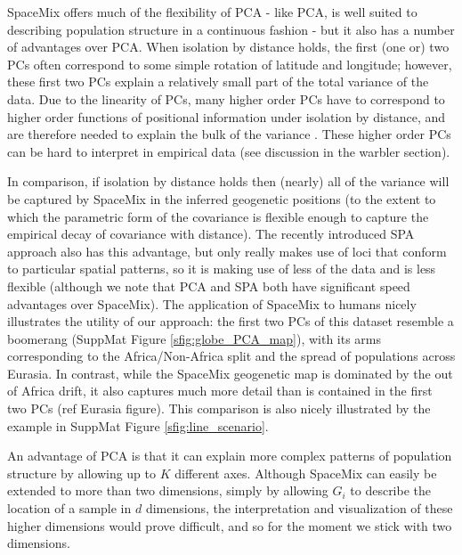 \documentclass[12pt]{article}
\begin{document}
SpaceMix offers much of the flexibility of PCA - like PCA, is well suited to describing population structure in a continuous fashion - 
but it also has a number of advantages over PCA. 
When isolation by distance holds, the first (one or) two PCs often correspond to some simple rotation of latitude and longitude; 
however, these first two PCs explain a relatively small part of the total variance of the data. 
Due to the linearity of PCs, many higher order PCs 
have to correspond to higher order functions of positional information under isolation by distance, 
and are therefore needed to explain the bulk of the variance \citep{novembre_interpreting_2008}. 
These higher order PCs can be hard to interpret in empirical data (see discussion in the warbler section).

In comparison, if isolation by distance holds then (nearly) all of the variance will be captured by SpaceMix in the inferred geogenetic positions 
(to the extent to which the parametric form of the covariance is flexible enough to capture the empirical decay of covariance with distance). 
The recently introduced SPA approach \citep{yang_model-based_2012} also has this advantage, 
but only really makes use of loci that conform to particular spatial patterns,
so it is making use of less of the data and is less flexible 
(although we note that PCA and SPA both have significant speed advantages over SpaceMix).  
The application of SpaceMix to humans nicely illustrates the utility of our approach: 
the first two PCs of this dataset resemble a boomerang (SuppMat Figure \ref{sfig:globe_PCA_map}), 
with its arms corresponding to the Africa/Non-Africa split and the spread of populations across Eurasia. 
In contrast, while the SpaceMix geogenetic map is dominated by the out of Africa drift, 
it also captures much more detail than is contained in the first two PCs (ref Eurasia figure).
This comparison is also nicely illustrated by the example in SuppMat Figure \ref{sfig:line_scenario}.

An advantage of PCA is that it can explain more complex patterns of population structure by allowing up to $K$ different axes.
Although SpaceMix can easily be extended to more than two dimensions, 
simply by allowing $G_i$ to describe the location of a sample in $d$ dimensions, 
the interpretation and visualization of these higher dimensions would prove difficult, 
and so for the moment we stick with two dimensions.
\end{document}
